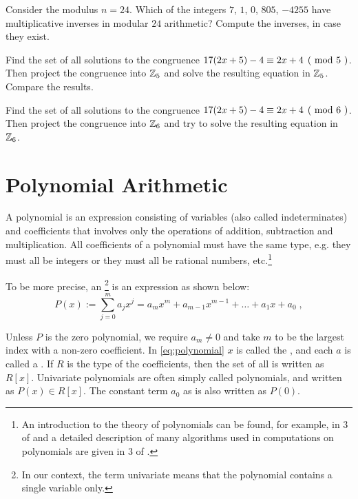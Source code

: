 \begin{exercise}
Consider the modulus $n=24$. Which of the integers $7$, $1$, $0$, $805$, $-4255$ have multiplicative inverses in modular $24$ arithmetic? Compute the inverses, in case they exist.
\end{exercise}
\begin{exercise}
Find the set of all solutions to the congruence $\kongru{17(2x+5)-4}{2x+4}{5}$. Then project the congruence into $\mathbb{Z}_5$ and solve the resulting equation in $\mathbb{Z}_5$. Compare the results.
\end{exercise}
\begin{exercise}
Find the set of all solutions to the congruence $\kongru{17(2x+5)-4}{2x+4}{6}$. Then project the congruence into $\mathbb{Z}_6$ and try to solve the resulting equation in $\mathbb{Z}_6$.
\end{exercise}
\section{Polynomial Arithmetic}
\label{sec:polynomial_arithmetics}
A polynomial is an expression consisting of variables (also called indeterminates) and coefficients that involves only the operations of addition, subtraction and multiplication. All coefficients of a polynomial must have the same type, e.g. they must all be integers or they must all be rational numbers, etc.\footnote{An introduction to the theory of polynomials can be found, for example, in \chaptname{} 3 of \cite{mignotte-1992} and a detailed description of many algorithms used in computations on polynomials are given in \chaptname{} 3 of \cite{cohen-2010}.}

To be more precise, an \footnote{In our context, the term univariate means that the polynomial contains a single variable only.}  is an expression  as shown below:
\begin{equation}\label{eq:polynomial}
P(x) := \sum _{j = 0} ^{m}{a} _{j}{x} ^{j} ={a} _{m}x^m +{a} _{m-1} x^{m-1} + \dots + a_1 x + a_0 \;,
\end{equation}

Unless $P$ is the zero polynomial, we require $a_m\neq 0$ and take $m$ to be the largest index with a non-zero coefficient. In \eqref{eq:polynomial} $x$ is called the , and each $ a$ is called a . If $R$ is the type of the coefficients, then the set of all  is written as $R[x]$. Univariate polynomials are often simply called polynomials, and written as $ P (x) \in R[x]$. The constant term $a_0$ as is also written as $ P(0)$.

